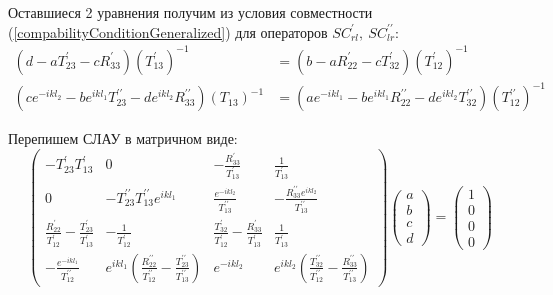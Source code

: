 \documentclass[a4 paper, 12 pt]{extarticle}
\begin{document}
   Оставшиеся 2 уравнения получим из условия совместности (\ref{compabilityConditionGeneralized}) для операторов $SC_{rl}^\prime, \ SC_{lr}^{\prime\prime}$:
   \[
   \begin{aligned}
   \left(d-aT_{23}^\prime -cR_{33}^\prime\right)\left(T_{13}^\prime\right)^{-1} &= \left(b-aR_{22}^\prime -c T_{32}^\prime\right)\left(T_{12}^\prime\right)^{-1} \\
   \left(c e^{-ikl_2}-b e^{ikl_1} T_{23}^{\prime\prime}-d e^{ikl_2}R_{33}^{\prime\prime}\right)\left(T_{13}\right)^{-1} &= \left(a e^{-ikl_1} - b e^{ikl_1} R_{22}^{\prime\prime} -d e^{ikl_2} T_{32}^{\prime\prime}\right)\left(T_{12}^{\prime\prime}\right)^{-1}
   \end{aligned}
   \]
   
   Перепишем СЛАУ в матричном виде:
   \[
   \begin{pmatrix}
   -T_{23}^{\prime}T_{13}^{\prime} & 0 & -\frac{R_{33}^{\prime}}{T_{13}^\prime} & \frac{1}{T_{13}^\prime}\\ 
   0 & -T_{23}^{\prime\prime} T_{13}^{\prime\prime} e^{ikl_1}  & \frac{e^{-ikl_2}}{T_{13}^{\prime\prime}} & -\frac{R_{33}^{\prime\prime}e^{ikl_2}}{T_{13}^{\prime\prime}} \\ 
   \frac{R_{22}^{\prime}}{T_{12}^{\prime}}-\frac{T_{23}^{\prime}}{T_{13}^{\prime}} & -\frac{1}{T_{12}^{\prime}} & \frac{T_{32}^{\prime}}{T_{12}^{\prime}}-\frac{R_{33}^{\prime}}{T_{13}^{\prime}} & \frac{1}{T_{13}^{\prime}}\\ 
   -\frac{e^{-ikl_1}}{T_{12}^{\prime\prime}} & e^{ikl_1}\left(\frac{R_{22}^{\prime\prime}}{T_{12}^{\prime\prime}} - \frac{T_{23}^{\prime\prime}}{T_{13}^{\prime\prime}}\right) & e^{-ikl_2} & e^{ikl_2}\left(\frac{T_{32}^{\prime\prime}}{T_{12}^{\prime\prime}} - \frac{R_{33}^{\prime\prime}}{T_{13}^{\prime\prime}}\right)
   \end{pmatrix}
   \begin{pmatrix}
   a \\
   b \\
   c \\
   d
   \end{pmatrix} = 
   \begin{pmatrix}
   1 \\
   0 \\
   0 \\
   0 
   \end{pmatrix}\]
   
\end{document}
